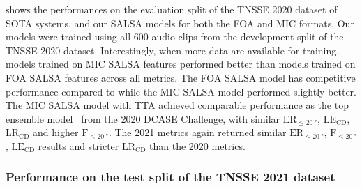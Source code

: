 \documentclass[journal]{IEEEtran}
\newcommand{\ER}{$\text{ER}_{\le \SI{20}{\degree}}$\xspace}
\newcommand{\Fone}{$\text{F}_{\le \SI{20}{\degree}}$\xspace}
\newcommand{\LE}{$\text{LE}_\text{CD}$\xspace}
\newcommand{\LR}{$\text{LR}_\text{CD}$\xspace}
\begin{document}
 shows the performances on the evaluation split of the TNSSE 2020 dataset of SOTA systems, and our SALSA models for both the FOA and MIC formats. Our models were trained using all \num{600} audio clips from the development split of the TNSSE 2020 dataset. Interestingly, when more data are available for training, models trained on MIC SALSA features performed better than models trained on FOA SALSA features across all metrics. The FOA SALSA model has competitive performance compared to \cite{Cao2021AnDetection} while the MIC SALSA model performed slightly better. The MIC SALSA model with TTA achieved comparable performance as the top ensemble model~\cite{Wang2020TheChallenge} from the 2020 DCASE Challenge, with similar \ER, \LE, \LR and higher \Fone. The 2021 metrics again returned similar \ER, \Fone, \LE results and stricter \LR than the 2020 metrics.   

\subsubsection{Performance on the test split of the TNSSE 2021 dataset}
\end{document}
